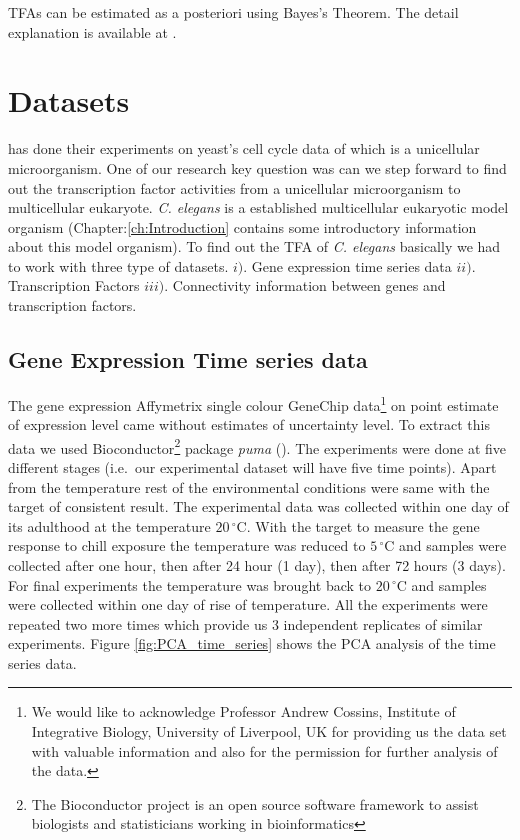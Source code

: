TFAs can be estimated as a posteriori using Bayes’s Theorem. The detail explanation is available at \cite{Sanguinetti:2006}.

\section{Datasets}
\cite{Sanguinetti:2006} has done their experiments on yeast's cell cycle data of \cite{Spellman:1998} which is a unicellular microorganism. One of our research key question was can we step forward to find out the transcription factor activities from a unicellular microorganism to multicellular eukaryote. \textit{C. elegans} is a established multicellular eukaryotic model organism (Chapter:\ref{ch:Introduction} contains some introductory information about this model organism). To find out the TFA of \textit{C. elegans} basically we had to work with three type of datasets. $i).$ Gene expression time series data $ii).$ Transcription Factors $iii).$ Connectivity information between genes and transcription factors.

\subsection{Gene Expression Time series data}
The gene expression Affymetrix single colour GeneChip data\footnote{We would like to acknowledge Professor Andrew Cossins, Institute of Integrative Biology, University of Liverpool, UK for providing us the data set with valuable information and also for the permission for further analysis of the data.} on point estimate of expression level came without estimates of uncertainty level. To extract this data we used Bioconductor\footnote{The Bioconductor project is an open source software framework to assist biologists and statisticians working in bioinformatics} package \textit{puma} (\cite{puma}). The experiments were done at five different stages (i.e.\ our experimental dataset will have five time points). Apart from the temperature rest of the environmental conditions were same with the target of consistent result. The experimental data was collected within one day of its adulthood at the temperature $20\,^{\circ}\mathrm{C}$. With the target to measure the gene response to chill exposure the temperature was reduced to $5\,^{\circ}\mathrm{C}$ and samples were collected after one hour, then after 24 hour (1 day), then after 72 hours (3 days). For final experiments the temperature was brought back to $20\,^{\circ}\mathrm{C}$
and samples were collected within one day  of rise of temperature. All the experiments were repeated two more times which provide us 3 independent replicates of similar experiments. Figure \ref{fig:PCA_time_series} shows the PCA analysis of the time series data.


